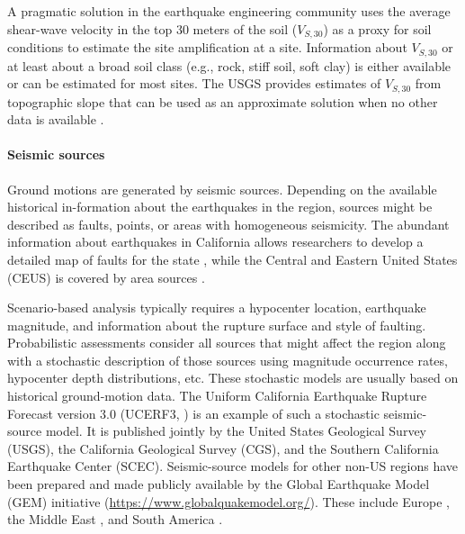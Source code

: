 A pragmatic solution in the earthquake engineering community uses the average shear-wave velocity in the top 30 meters of the soil ($V_{S,30}$) as a proxy for soil conditions to estimate the site amplification at a site. Information about $V_{S,30}$ or at least about a broad soil class (e.g., rock, stiff soil, soft clay) is either available or can be estimated for most sites. The USGS provides estimates of $V_{S,30}$ from topographic slope that can be used as an approximate solution when no other data is available \citep{usgs2020vs30}. 

\paragraph{Seismic sources} Ground motions are generated by seismic sources. Depending on the available historical in-formation about the earthquakes in the region, sources might be described as faults, points, or areas with homogeneous seismicity. The abundant information about earthquakes in California allows researchers to develop a detailed map of faults for the state \citep{field2014uniform}, while the Central and Eastern United States (CEUS) is covered by area sources \citep{mueller2015seismic}.

Scenario-based analysis typically requires a hypocenter location, earthquake magnitude, and information about the rupture surface and style of faulting. Probabilistic assessments consider all sources that might affect the region along with a stochastic description of those sources using magnitude occurrence rates, hypocenter depth distributions, etc. These stochastic models are usually based on historical ground-motion data. The Uniform California Earthquake Rupture Forecast version 3.0 (UCERF3, \cite{field2014uniform}) is an example of such a stochastic seismic-source model. It is published jointly by the United States Geological Survey (USGS), the California Geological Survey (CGS), and the Southern California Earthquake Center (SCEC). Seismic-source models for other non-US regions have been prepared and made publicly available by the Global Earthquake Model (GEM) initiative (\url{https://www.globalquakemodel.org/}). These include Europe \citep{giardini2014mapping}, the Middle East \citep{danciu20172014}, and South America \citep{garcia2018creation}.

